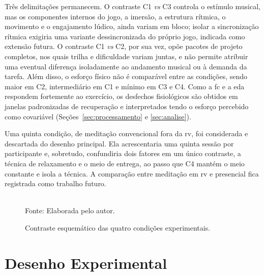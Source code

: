 Três delimitações permanecem. O contraste C1 \textit{vs} C3 controla o estímulo musical, mas os componentes internos do jogo, a imersão, a estrutura rítmica, o movimento e o engajamento lúdico, ainda variam em bloco; isolar a sincronização rítmica exigiria uma variante dessincronizada do próprio jogo, indicada como extensão futura. O contraste C1 \textit{vs} C2, por sua vez, opõe pacotes de projeto completos, nos quais trilha e dificuldade variam juntas, e não permite atribuir uma eventual diferença isoladamente ao andamento musical ou à demanda da tarefa. Além disso, o esforço físico não é comparável entre as condições, sendo maior em C2, intermediário em C1 e mínimo em C3 e C4. Como a \gls{fc} e a \gls{eda} respondem fortemente ao exercício, os desfechos fisiológicos são obtidos em janelas padronizadas de recuperação e interpretados tendo o esforço percebido como covariável (Seções~\ref{sec:processamento} e \ref{sec:analise}).

Uma quinta condição, de meditação convencional fora da \gls{rv}, foi considerada e descartada do desenho principal. Ela acrescentaria uma quinta sessão por participante e, sobretudo, confundiria dois fatores em um único contraste, a técnica de relaxamento e o meio de entrega, ao passo que C4 mantém o meio constante e isola a técnica. A comparação entre meditação em \gls{rv} e presencial fica registrada como trabalho futuro.

\begin{figure}[H]
    \centering
    \caption{Contraste esquemático das quatro condições experimentais. }
    \label{fig:modos}
    \\[2pt]
    {\footnotesize Fonte: Elaborada pelo autor.}
\end{figure}

\section{Desenho Experimental}\label{sec:desenho}

